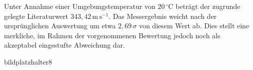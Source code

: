 \documentclass[11pt,a4paper]{article}
\begin{document}
Unter Annahme einer Umgebungstemperatur von $\mathrm{20\,^\circ C}$ beträgt der zugrunde gelegte Literaturwert $\mathrm{343{,}42\,m\,s^{-1}}$. Das Messergebnis weicht nach der ursprünglichen Auswertung um etwa $2{,}69\,\sigma$ von diesem Wert ab. Dies stellt eine merkliche, im Rahmen der vorgenommenen Bewertung jedoch noch als akzeptabel eingestufte Abweichung dar.

bildplatzhalter{8}
\end{document}
